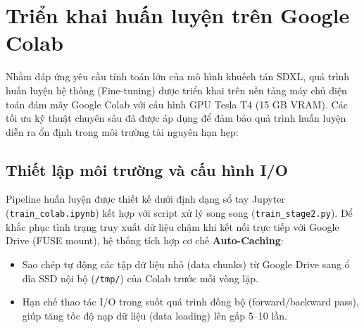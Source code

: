 \documentclass[../main.tex]{subfiles}
\begin{document}
\section{Triển khai huấn luyện trên Google Colab}

Nhằm đáp ứng yêu cầu tính toán lớn của mô hình khuếch tán SDXL, quá trình huấn luyện hệ thống (Fine-tuning) được triển khai trên nền tảng máy chủ điện toán đám mây Google Colab với cấu hình GPU Tesla T4 (15 GB VRAM). Các tối ưu kỹ thuật chuyên sâu đã được áp dụng để đảm bảo quá trình huấn luyện diễn ra ổn định trong môi trường tài nguyên hạn hẹp:

\subsection{Thiết lập môi trường và cấu hình I/O}
Pipeline huấn luyện được thiết kế dưới định dạng sổ tay Jupyter (\texttt{train\_colab.ipynb}) kết hợp với script xử lý song song (\texttt{train\_stage2.py}). Để khắc phục tình trạng truy xuất dữ liệu chậm khi kết nối trực tiếp với Google Drive (FUSE mount), hệ thống tích hợp cơ chế \textbf{Auto-Caching}:
\begin{itemize}
    \item Sao chép tự động các tập dữ liệu nhỏ (data chunks) từ Google Drive sang ổ đĩa SSD nội bộ (\texttt{/tmp/}) của Colab trước mỗi vòng lặp.
    \item Hạn chế thao tác I/O trong suốt quá trình đồng bộ (forward/backward pass), giúp tăng tốc độ nạp dữ liệu (data loading) lên gấp 5--10 lần.
\end{itemize}
\end{document}

